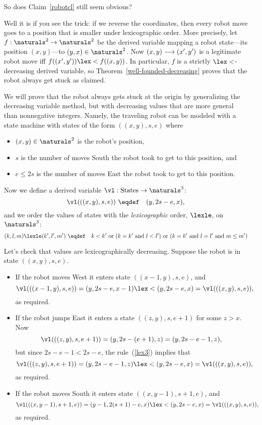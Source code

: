 \begin{editingnotes}
So does Claim~\ref{robotcl} still seem obvious?

Well it is if you see the trick: if we reverse the coordinates, then every
robot move goes to a position that is smaller under lexicographic order.
More precisely, let $f:\naturals^2 \to \naturals^2$ be the derived variable
mapping a robot state---its position $(x,y)$---to $(y,x) \in
\naturals^2$.  Now $(x,y)\mathrel{\longrightarrow} (x',y')$ is a legitimate robot move iff
$f((x',y')) \lex< f((x,y))$.  In particular, $f$ is a strictly
$\lex<$-decreasing derived variable, so
Theorem~\ref{well-founded-decreasing} proves that the robot always get
stuck as claimed.
\end{editingnotes}

\iffalse

We will prove that the robot always gets stuck at the origin by
generalizing the decreasing variable method, but with decreasing values
that are more general than nonnegative integers.  Namely, the traveling robot
can be modeled with a state machine with states of the form $((x,y),s,e)$
where
\begin{itemize}
\item $(x,y) \in \naturals^2$ is the robot's position,
\item $s$ is the number of moves South the robot took to get to this
position, and
\item $e \le 2s$ is the number of moves East the robot took to get to this
position. 
\end{itemize}

Now we define a derived variable $\vl:\text{States}\to \naturals^3$:
\[
\vl(((x,y),s,e)) \ \eqdef\quad (y,2s-e,x),
\]
and we order the values of states with the \emph{lexicographic} order,
$\lexle$, on $\naturals^3$:
\begin{equation}\label{lex3}
(k,l,m) \lexle (k',l',m') \ \eqdef\quad k < k' \text{ or } (k=k' \text{
and } l < l') \text{ or } (k=k' \text{ and } l = l' \text{ and } m \le m')
\end{equation}

Let's check that values are lexicographically decreasing.  Suppose the
robot is in state $((x,y),s,e)$.
\begin{itemize}
\item If the robot moves West it enters state $((x-1,y),s,e)$, and
\[
\vl(((x-1,y),s,e)) = (y,2s-e,x-1) \lex< (y,2s-e,x) = \vl(((x,y),s,e)),
\]
as required.


\item If the robot jumps East it enters a state $((z,y),s,e+1)$ for some
$z>x$.  Now
\[
\vl(((z,y),s,e+1)) = (y,2s-(e+1),z) = (y,2s-e-1,z),
\]
but since $2s-e-1 < 2s-e$, the rule~(\ref{lex3}) implies that
\[
\vl(((z,y),s,e+1)) = (y,2s-e-1,z)  \lex< (y,2s-e,x) = \vl(((x,y),s,e)),
\]
as required.

\item If the robot moves South it enters state $((x,y-1),s+1,e)$, and
\[
\vl(((x,y-1),s+1,e)) = (y-1,2(s+1)-e,x) \lex< (y,2s-e,x) = \vl(((x,y),s,e)),
\]
as required.

\end{itemize}

